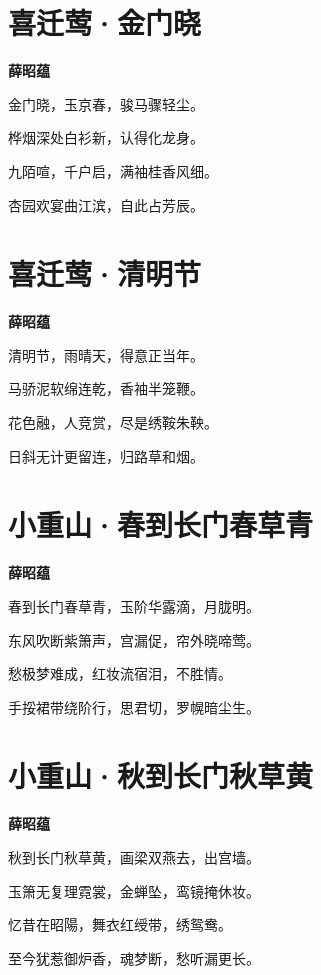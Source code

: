 \documentclass[12pt,a4paper]{ctexbook}
\begin{document}
\section{喜迁莺·金门晓}
\textbf{薛昭蕴}\par\vspace{0.5em}
金门晓，玉京春，骏马骤轻尘。\par
桦烟深处白衫新，认得化龙身。\par
九陌喧，千户启，满袖桂香风细。\par
杏园欢宴曲江滨，自此占芳辰。\par

\section{喜迁莺·清明节}
\textbf{薛昭蕴}\par\vspace{0.5em}
清明节，雨晴天，得意正当年。\par
马骄泥软绵连乾，香袖半笼鞭。\par
花色融，人竞赏，尽是绣鞍朱鞅。\par
日斜无计更留连，归路草和烟。\par

\section{小重山·春到长门春草青}
\textbf{薛昭蕴}\par\vspace{0.5em}
春到长门春草青，玉阶华露滴，月胧明。\par
东风吹断紫箫声，宫漏促，帘外晓啼莺。\par
愁极梦难成，红妆流宿泪，不胜情。\par
手挼裙带绕阶行，思君切，罗幌暗尘生。\par

\section{小重山·秋到长门秋草黄}
\textbf{薛昭蕴}\par\vspace{0.5em}
秋到长门秋草黄，画梁双燕去，出宫墙。\par
玉箫无复理霓裳，金蝉坠，鸾镜掩休妆。\par
忆昔在昭陽，舞衣红绶带，绣鸳鸯。\par
至今犹惹御炉香，魂梦断，愁听漏更长。\par
\end{document}

